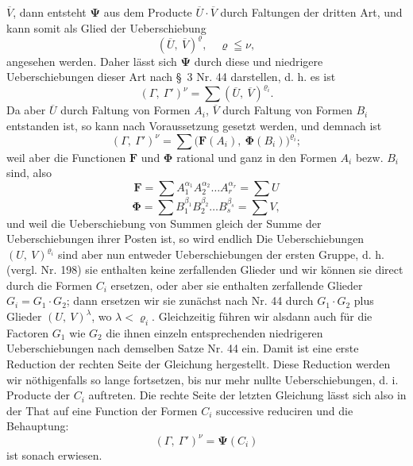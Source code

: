 $\overline V$, dann entsteht $\boldsymbol{\Psi}$ aus dem Producte $\overline U\cdot\overline V$
durch Faltungen der dritten Art, und kann somit als Glied der
Ueberschiebung
\[ (\overline U,\ \overline V)^\varrho,\quad \varrho \leqq \nu, \]
angesehen werden. Daher lässt sich $\boldsymbol{\Psi}$ durch diese und niedrigere
Ueberschiebungen dieser Art nach \S~3 Nr. 44 darstellen, d. h. es ist
\[ (\Gamma,\ \Gamma')^\nu = \sum (\overline U,\ \overline V)^{\varrho_i}. \]
Da aber $\overline U$ durch Faltung von Formen $A_i$, $\overline V$ durch Faltung
von Formen $B_i$ entstanden ist, so kann nach Voraussetzung
gesetzt werden, und demnach ist
\[ (\Gamma,\ \Gamma')^\nu = \sum \big(\boldsymbol{F}(A_i),\ \boldsymbol{\Phi}(B_i)\big)^{\varrho_i}; \]
weil aber die Functionen $\boldsymbol{F}$ und $\boldsymbol{\Phi}$ rational und ganz in den
Formen $A_i$ bezw. $B_i$ sind, also
\[ \boldsymbol{F} = \sum A_1^{\alpha_1} A_2^{\alpha_2} \ldots A_r^{\alpha_r} = \sum U \]
\[ \boldsymbol{\Phi} = \sum B_1^{\beta_1} B_2^{\beta_2} \ldots B_s^{\beta_s} = \sum V, \]
und weil die Ueberschiebung von Summen gleich der Summe der
Ueberschiebungen ihrer Posten ist, so wird endlich
Die Ueberschiebungen $(U,\ V)^{\varrho_i}$ sind aber nun entweder
Ueberschiebungen der ersten Gruppe, d. h. (vergl. Nr. 198) sie enthalten
keine zerfallenden Glieder und wir können sie direct durch die Formen
$C_i$ ersetzen, oder aber sie enthalten zerfallende Glieder
$G_i = G_1\cdot G_2$; dann ersetzen wir sie zunächst nach Nr. 44 durch
$G_1\cdot G_2$ plus Glieder 
$(U,\ V)^\lambda$, wo $\lambda < \varrho_i$. Gleichzeitig führen wir alsdann
auch für die Factoren $G_1$ wie $G_2$ die ihnen einzeln entsprechenden
niedrigeren Ueberschiebungen nach demselben Satze Nr. 44 ein. Damit
ist eine erste Reduction der rechten Seite der Gleichung hergestellt.
Diese Reduction werden wir nöthigenfalls so lange fortsetzen, bis nur
mehr nullte Ueberschiebungen, d. i. Producte der $C_i$ auftreten. Die
rechte Seite der letzten Gleichung lässt sich also in der That auf
eine Function der Formen $C_i$ successive reduciren und die
Behauptung:
\[ (\Gamma,\ \Gamma')^\nu = \boldsymbol{\Psi}(C_i) \]
ist sonach erwiesen.


